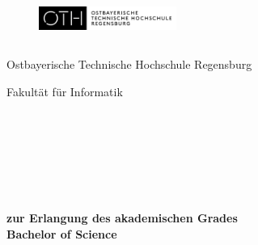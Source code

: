 \thispagestyle{empty}

\begin{figure}[t]
 \centering
 \includegraphics[width=0.4\textwidth]{assets/oth/logo}
\end{figure}

\begin{verbatim}
\end{verbatim}

\begin{center}
    \Large{Ostbayerische Technische Hochschule Regensburg}
\end{center}

\begin{center}
    \Large{Fakultät für Informatik}
\end{center}

\begin{verbatim}
\end{verbatim}

\begin{center}
    \doublespacing
    \textbf{\LARGE{\titleDocument}}\\

    \singlespacing

    \begin{verbatim}
    \end{verbatim}

    \textbf{{~\subjectDocument}}
\end{center}

\begin{verbatim}
\end{verbatim}

\begin{verbatim}
\end{verbatim}

\begin{center}
    \textbf{zur Erlangung des akademischen Grades \\ Bachelor of Science}
\end{center}

\begin{verbatim}
\end{verbatim}

